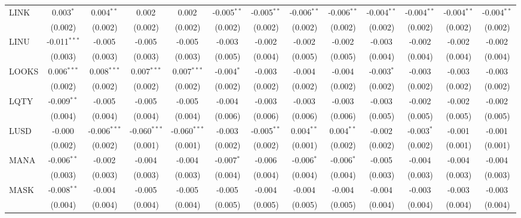 \begin{table}[!htbp]
\begin{tabular}{@{\extracolsep{5pt}}lcccccccccccc}
 LINK & 0.003$^{*}$ & 0.004$^{**}$ & 0.002$^{}$ & 0.002$^{}$ & -0.005$^{**}$ & -0.005$^{**}$ & -0.006$^{**}$ & -0.006$^{**}$ & -0.004$^{**}$ & -0.004$^{**}$ & -0.004$^{**}$ & -0.004$^{**}$ \\
  & (0.002) & (0.002) & (0.002) & (0.002) & (0.002) & (0.002) & (0.002) & (0.002) & (0.002) & (0.002) & (0.002) & (0.002) \\
 LINU & -0.011$^{***}$ & -0.005$^{}$ & -0.005$^{}$ & -0.005$^{}$ & -0.003$^{}$ & -0.002$^{}$ & -0.002$^{}$ & -0.002$^{}$ & -0.003$^{}$ & -0.002$^{}$ & -0.002$^{}$ & -0.002$^{}$ \\
  & (0.003) & (0.003) & (0.003) & (0.003) & (0.005) & (0.004) & (0.005) & (0.005) & (0.004) & (0.004) & (0.004) & (0.004) \\
 LOOKS & 0.006$^{***}$ & 0.008$^{***}$ & 0.007$^{***}$ & 0.007$^{***}$ & -0.004$^{*}$ & -0.003$^{}$ & -0.004$^{}$ & -0.004$^{}$ & -0.003$^{*}$ & -0.003$^{}$ & -0.003$^{}$ & -0.003$^{}$ \\
  & (0.002) & (0.002) & (0.002) & (0.002) & (0.002) & (0.002) & (0.002) & (0.002) & (0.002) & (0.002) & (0.002) & (0.002) \\
 LQTY & -0.009$^{**}$ & -0.005$^{}$ & -0.005$^{}$ & -0.005$^{}$ & -0.004$^{}$ & -0.003$^{}$ & -0.003$^{}$ & -0.003$^{}$ & -0.003$^{}$ & -0.002$^{}$ & -0.002$^{}$ & -0.002$^{}$ \\
  & (0.004) & (0.004) & (0.004) & (0.004) & (0.006) & (0.006) & (0.006) & (0.006) & (0.005) & (0.005) & (0.005) & (0.005) \\
 LUSD & -0.000$^{}$ & -0.006$^{***}$ & -0.060$^{***}$ & -0.060$^{***}$ & -0.003$^{}$ & -0.005$^{**}$ & 0.004$^{**}$ & 0.004$^{**}$ & -0.002$^{}$ & -0.003$^{*}$ & -0.001$^{}$ & -0.001$^{}$ \\
  & (0.002) & (0.002) & (0.001) & (0.001) & (0.002) & (0.002) & (0.001) & (0.002) & (0.002) & (0.002) & (0.001) & (0.001) \\
 MANA & -0.006$^{**}$ & -0.002$^{}$ & -0.004$^{}$ & -0.004$^{}$ & -0.007$^{*}$ & -0.006$^{}$ & -0.006$^{*}$ & -0.006$^{*}$ & -0.005$^{}$ & -0.004$^{}$ & -0.004$^{}$ & -0.004$^{}$ \\
  & (0.003) & (0.003) & (0.003) & (0.003) & (0.004) & (0.004) & (0.004) & (0.004) & (0.003) & (0.003) & (0.003) & (0.003) \\
 MASK & -0.008$^{**}$ & -0.004$^{}$ & -0.005$^{}$ & -0.005$^{}$ & -0.005$^{}$ & -0.004$^{}$ & -0.004$^{}$ & -0.004$^{}$ & -0.004$^{}$ & -0.003$^{}$ & -0.003$^{}$ & -0.003$^{}$ \\
  & (0.004) & (0.004) & (0.004) & (0.004) & (0.005) & (0.005) & (0.005) & (0.005) & (0.004) & (0.004) & (0.004) & (0.004) \\

\end{tabular}
\end{table}
